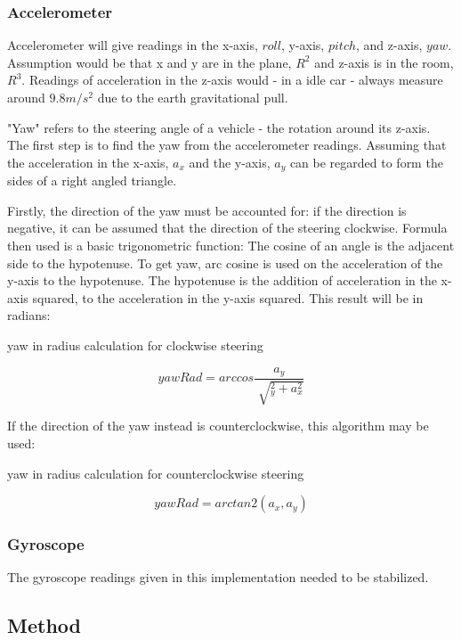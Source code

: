 \documentclass[12pt]{article}
\begin{document}
\subsubsection{Accelerometer}
Accelerometer will give readings in the x-axis, $roll$, y-axis, $pitch$, and z-axis, $yaw$. Assumption would be that x and y are in the plane, $R^2$ and z-axis is in the room, $R^3$. Readings of acceleration in the z-axis would - in a idle car - always measure around  $9.8 m/s^2$ due to the earth gravitational pull.

"Yaw" refers to the steering angle of a vehicle - the rotation around its z-axis. The first step is to find the yaw from the accelerometer readings. Assuming that the acceleration in the x-axis, $a_x$ and the y-axis, $a_y$ can be regarded to form the sides of a right angled triangle. 

Firstly, the direction of the yaw must be accounted for: if the direction is negative, it can be assumed that the direction of the steering clockwise. 
Formula then used is a basic trigonometric function: The cosine of an angle is the adjacent side to the hypotenuse. To get yaw, arc cosine is used on the acceleration of the y-axis to the hypotenuse. The hypotenuse is the addition of acceleration in the x-axis squared, to the acceleration in the y-axis squared. This result will be in radians:


\begin{algorithm}                 
    \caption{yaw in radius calculation for clockwise steering}    
		\[yawRad = arccos\frac{a_y}{\sqrt[]{_y^2 + a_x^2}}\]
\end{algorithm}

If the direction of the yaw instead is counterclockwise, this algorithm may be used: 


\begin{algorithm}                 
    \caption{yaw in radius calculation for counterclockwise steering}    
		\[yawRad = arctan2(a_x,a_y)\]
\end{algorithm}

\subsubsection{Gyroscope}
The gyroscope readings given in this implementation needed to be stabilized. 
 

\subsection{Method}
\end{document}
